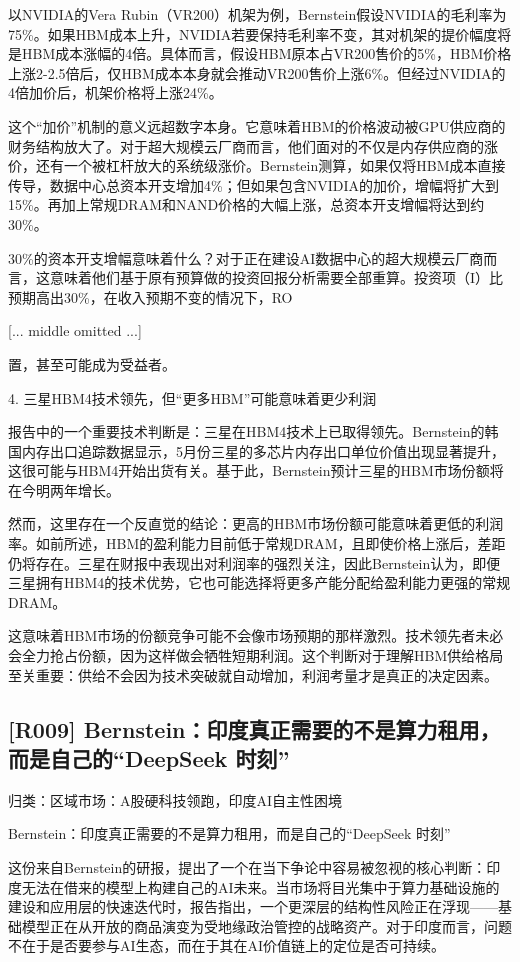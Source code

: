 \documentclass[11pt]{ctexart}
\begin{document}
以NVIDIA的Vera Rubin（VR200）机架为例，Bernstein假设NVIDIA的毛利率为75\%。如果HBM成本上升，NVIDIA若要保持毛利率不变，其对机架的提价幅度将是HBM成本涨幅的4倍。具体而言，假设HBM原本占VR200售价的5\%，HBM价格上涨2-2.5倍后，仅HBM成本本身就会推动VR200售价上涨6\%。但经过NVIDIA的4倍加价后，机架价格将上涨24\%。

这个“加价”机制的意义远超数字本身。它意味着HBM的价格波动被GPU供应商的财务结构放大了。对于超大规模云厂商而言，他们面对的不仅是内存供应商的涨价，还有一个被杠杆放大的系统级涨价。Bernstein测算，如果仅将HBM成本直接传导，数据中心总资本开支增加4\%；但如果包含NVIDIA的加价，增幅将扩大到15\%。再加上常规DRAM和NAND价格的大幅上涨，总资本开支增幅将达到约30\%。

30\%的资本开支增幅意味着什么？对于正在建设AI数据中心的超大规模云厂商而言，这意味着他们基于原有预算做的投资回报分析需要全部重算。投资项（I）比预期高出30\%，在收入预期不变的情况下，RO

[... middle omitted ...]

置，甚至可能成为受益者。

4. 三星HBM4技术领先，但“更多HBM”可能意味着更少利润

报告中的一个重要技术判断是：三星在HBM4技术上已取得领先。Bernstein的韩国内存出口追踪数据显示，5月份三星的多芯片内存出口单位价值出现显著提升，这很可能与HBM4开始出货有关。基于此，Bernstein预计三星的HBM市场份额将在今明两年增长。

然而，这里存在一个反直觉的结论：更高的HBM市场份额可能意味着更低的利润率。如前所述，HBM的盈利能力目前低于常规DRAM，且即使价格上涨后，差距仍将存在。三星在财报中表现出对利润率的强烈关注，因此Bernstein认为，即便三星拥有HBM4的技术优势，它也可能选择将更多产能分配给盈利能力更强的常规DRAM。

这意味着HBM市场的份额竞争可能不会像市场预期的那样激烈。技术领先者未必会全力抢占份额，因为这样做会牺牲短期利润。这个判断对于理解HBM供给格局至关重要：供给不会因为技术突破就自动增加，利润考量才是真正的决定因素。

\subsection{[R009] Bernstein：印度真正需要的不是算力租用，而是自己的“DeepSeek 时刻”}
{\small\color{refgray}归类：区域市场：A股硬科技领跑，印度AI自主性困境}

Bernstein：印度真正需要的不是算力租用，而是自己的“DeepSeek 时刻”

这份来自Bernstein的研报，提出了一个在当下争论中容易被忽视的核心判断：印度无法在借来的模型上构建自己的AI未来。当市场将目光集中于算力基础设施的建设和应用层的快速迭代时，报告指出，一个更深层的结构性风险正在浮现——基础模型正在从开放的商品演变为受地缘政治管控的战略资产。对于印度而言，问题不在于是否要参与AI生态，而在于其在AI价值链上的定位是否可持续。
\end{document}

